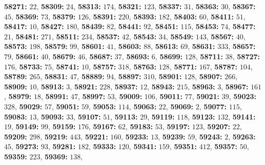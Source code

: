 \textsf{\bfseries 58271:} $22$, \textsf{\bfseries 58309:} $24$, \textsf{\bfseries 58313:} $174$, \textsf{\bfseries 58321:} $123$, \textsf{\bfseries 58337:} $31$, \textsf{\bfseries 58363:} $30$, \textsf{\bfseries 58367:} $45$, \textsf{\bfseries 58369:} $73$, \textsf{\bfseries 58379:} $126$, \textsf{\bfseries 58391:} $220$, \textsf{\bfseries 58393:} $182$, \textsf{\bfseries 58403:} $60$, \textsf{\bfseries 58411:} $51$, \textsf{\bfseries 58417:} $10$, \textsf{\bfseries 58427:} $180$, \textsf{\bfseries 58439:} $82$, \textsf{\bfseries 58441:} $92$, \textsf{\bfseries 58451:} $115$, \textsf{\bfseries 58453:} $74$, \textsf{\bfseries 58477:} $21$, \textsf{\bfseries 58481:} $271$, \textsf{\bfseries 58511:} $234$, \textsf{\bfseries 58537:} $42$, \textsf{\bfseries 58543:} $34$, \textsf{\bfseries 58549:} $143$, \textsf{\bfseries 58567:} $40$, \textsf{\bfseries 58573:} $198$, \textsf{\bfseries 58579:} $99$, \textsf{\bfseries 58601:} $41$, \textsf{\bfseries 58603:} $88$, \textsf{\bfseries 58613:} $69$, \textsf{\bfseries 58631:} $333$, \textsf{\bfseries 58657:} $79$, \textsf{\bfseries 58661:} $40$, \textsf{\bfseries 58679:} $46$, \textsf{\bfseries 58687:} $37$, \textsf{\bfseries 58693:} $6$, \textsf{\bfseries 58699:} $128$, \textsf{\bfseries 58711:} $38$, \textsf{\bfseries 58727:} $176$, \textsf{\bfseries 58733:} $75$, \textsf{\bfseries 58741:} $10$, \textsf{\bfseries 58757:} $318$, \textsf{\bfseries 58763:} $128$, \textsf{\bfseries 58771:} $167$, \textsf{\bfseries 58787:} $104$, \textsf{\bfseries 58789:} $265$, \textsf{\bfseries 58831:} $47$, \textsf{\bfseries 58889:} $94$, \textsf{\bfseries 58897:} $310$, \textsf{\bfseries 58901:} $128$, \textsf{\bfseries 58907:} $266$, \textsf{\bfseries 58909:} $10$, \textsf{\bfseries 58913:} $3$, \textsf{\bfseries 58921:} $228$, \textsf{\bfseries 58937:} $12$, \textsf{\bfseries 58943:} $215$, \textsf{\bfseries 58963:} $3$, \textsf{\bfseries 58967:} $161$, \textsf{\bfseries 58979:} $18$, \textsf{\bfseries 58991:} $47$, \textsf{\bfseries 58997:} $53$, \textsf{\bfseries 59009:} $106$, \textsf{\bfseries 59011:} $77$, \textsf{\bfseries 59021:} $39$, \textsf{\bfseries 59023:} $328$, \textsf{\bfseries 59029:} $57$, \textsf{\bfseries 59051:} $59$, \textsf{\bfseries 59053:} $114$, \textsf{\bfseries 59063:} $22$, \textsf{\bfseries 59069:} $2$, \textsf{\bfseries 59077:} $115$, \textsf{\bfseries 59083:} $13$, \textsf{\bfseries 59093:} $33$, \textsf{\bfseries 59107:} $51$, \textsf{\bfseries 59113:} $29$, \textsf{\bfseries 59119:} $118$, \textsf{\bfseries 59123:} $132$, \textsf{\bfseries 59141:} $19$, \textsf{\bfseries 59149:} $99$, \textsf{\bfseries 59159:} $176$, \textsf{\bfseries 59167:} $62$, \textsf{\bfseries 59183:} $53$, \textsf{\bfseries 59197:} $123$, \textsf{\bfseries 59207:} $22$, \textsf{\bfseries 59209:} $298$, \textsf{\bfseries 59219:} $443$, \textsf{\bfseries 59221:} $160$, \textsf{\bfseries 59233:} $13$, \textsf{\bfseries 59239:} $59$, \textsf{\bfseries 59243:} $2$, \textsf{\bfseries 59263:} $45$, \textsf{\bfseries 59273:} $93$, \textsf{\bfseries 59281:} $182$, \textsf{\bfseries 59333:} $120$, \textsf{\bfseries 59341:} $159$, \textsf{\bfseries 59351:} $412$, \textsf{\bfseries 59357:} $50$, \textsf{\bfseries 59359:} $223$, \textsf{\bfseries 59369:} $138$, 
